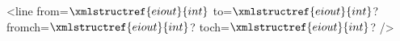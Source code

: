 <line from=$\xmlstructref{eiout}{int}$ to=$\xmlstructref{eiout}{int}$? fromch=$\xmlstructref{eiout}{int}$? toch=$\xmlstructref{eiout}{int}$? />

